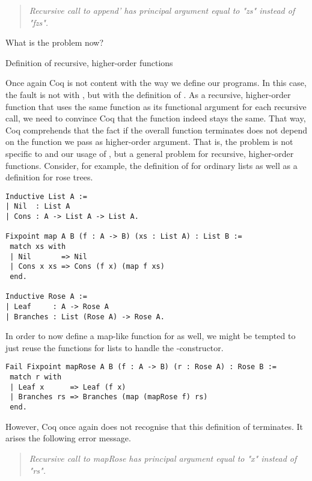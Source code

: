 \begin{quote}
\emph{Recursive call to append' has principal argument equal to "zs" instead of
"fzs".}
\end{quote}

What is the problem now?

\begin{excursus}{Definition of recursive, higher-order functions}

Once again Coq is not content with the way we define our programs.
In this case, the fault is not with , but with the
definition of .
As a recursive, higher-order function that uses the same function as its
functional argument for each recursive call, we need to convince Coq
that the function indeed stays the same.
That way, Coq comprehends that the fact if the overall function
terminates does not depend on the function we pass as higher-order
argument.
That is, the problem is not specific to  and our usage
of , but a general problem for recursive, higher-order
functions.
Consider, for example, the definition of  for ordinary
lists as well as a definition for rose trees.

\begin{verbatim}
Inductive List A :=
| Nil  : List A
| Cons : A -> List A -> List A.

Fixpoint map A B (f : A -> B) (xs : List A) : List B :=
 match xs with
 | Nil       => Nil
 | Cons x xs => Cons (f x) (map f xs)
 end.

Inductive Rose A :=
| Leaf     : A -> Rose A
| Branches : List (Rose A) -> Rose A.
\end{verbatim}

In order to now define a map-like function for  as well, we
might be tempted to just reuse the  functions for lists to
handle the -constructor.

\begin{verbatim}
Fail Fixpoint mapRose A B (f : A -> B) (r : Rose A) : Rose B :=
 match r with
 | Leaf x      => Leaf (f x)
 | Branches rs => Branches (map (mapRose f) rs)
 end.
\end{verbatim}

However, Coq once again does not recognise that this definition of
 terminates.
It arises the following error message.

\begin{quote}
\emph{Recursive call to mapRose has principal argument equal to "x" instead of "rs".}
 \end{quote}


\end{excursus}
